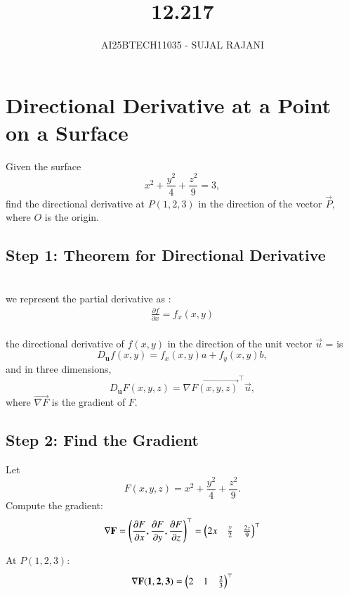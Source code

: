 \documentclass[journal,12pt,onecolumn]{IEEEtran}
\begin{document}
\title{12.217}
\author{AI25BTECH11035 - SUJAL RAJANI}
{\let\newpage\relax\maketitle}
\section*{Directional Derivative at a Point on a Surface}

Given the surface
\[
x^2 + \frac{y^2}{4} + \frac{z^2}{9} = 3,
\]
find the directional derivative at \(P(1,2,3)\) in the direction of the vector $\vec{P}$, where \(O\) is the origin.

\subsection*{Step 1: Theorem for Directional Derivative}
\\
we represent the partial derivative as :
\\
\begin{align*}
    \frac{\partial f}{\partial x}=f_x(x,y)
\end{align*} 
\\
 the directional derivative of \(f(x, y)\) in the direction of the unit vector $\vec{u}$ =   is
\[
D_{\mathbf{u}} f(x, y) = f_x(x, y)a + f_y(x, y)b,
\]
and in three dimensions,
\[
D_{\mathbf{u}} F(x, y, z) = \vec{\nabla F(x, y, z)}^\top  \vec{u},
\]
where $\vec{\nabla F}$ is the gradient of \(F\).

\subsection*{Step 2: Find the Gradient}

Let
\[
F(x, y, z) = x^2 + \frac{y^2}{4} + \frac{z^2}{9}.
\]
Compute the gradient:
\[
\mathbf{\nabla F} = \left( \frac{\partial F}{\partial x}, \frac{\partial F}{\partial y}, \frac{\partial F}{\partial z} \right)^\top
= \begin{pmatrix}2x& \frac{y}{2}& \frac{2z}{9}\end{pmatrix}^\top
\]

At \(P(1,2,3)\):
\begin{align*}
\mathbf{\nabla F(1,2,3)} =  \begin{pmatrix}2&1&\frac{2}{3}\end{pmatrix}^\top
\end{align*}
\end{document}
